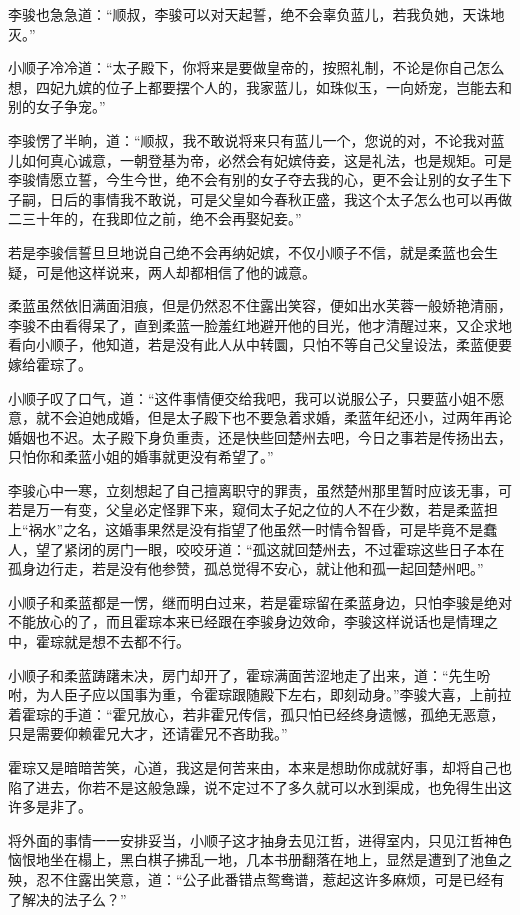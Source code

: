 李骏也急急道：“顺叔，李骏可以对天起誓，绝不会辜负蓝儿，若我负她，天诛地灭。”

小顺子冷冷道：“太子殿下，你将来是要做皇帝的，按照礼制，不论是你自己怎么想，四妃九嫔的位子上都要摆个人的，我家蓝儿，如珠似玉，一向娇宠，岂能去和别的女子争宠。”

李骏愣了半晌，道：“顺叔，我不敢说将来只有蓝儿一个，您说的对，不论我对蓝儿如何真心诚意，一朝登基为帝，必然会有妃嫔侍妾，这是礼法，也是规矩。可是李骏情愿立誓，今生今世，绝不会有别的女子夺去我的心，更不会让别的女子生下子嗣，日后的事情我不敢说，可是父皇如今春秋正盛，我这个太子怎么也可以再做二三十年的，在我即位之前，绝不会再娶妃妾。”

若是李骏信誓旦旦地说自己绝不会再纳妃嫔，不仅小顺子不信，就是柔蓝也会生疑，可是他这样说来，两人却都相信了他的诚意。

柔蓝虽然依旧满面泪痕，但是仍然忍不住露出笑容，便如出水芙蓉一般娇艳清丽，李骏不由看得呆了，直到柔蓝一脸羞红地避开他的目光，他才清醒过来，又企求地看向小顺子，他知道，若是没有此人从中转圜，只怕不等自己父皇设法，柔蓝便要嫁给霍琮了。

小顺子叹了口气，道：“这件事情便交给我吧，我可以说服公子，只要蓝小姐不愿意，就不会迫她成婚，但是太子殿下也不要急着求婚，柔蓝年纪还小，过两年再论婚姻也不迟。太子殿下身负重责，还是快些回楚州去吧，今日之事若是传扬出去，只怕你和柔蓝小姐的婚事就更没有希望了。”

李骏心中一寒，立刻想起了自己擅离职守的罪责，虽然楚州那里暂时应该无事，可若是万一有变，父皇必定怪罪下来，窥伺太子妃之位的人不在少数，若是柔蓝担上“祸水”之名，这婚事果然是没有指望了他虽然一时情令智昏，可是毕竟不是蠢人，望了紧闭的房门一眼，咬咬牙道：“孤这就回楚州去，不过霍琮这些日子本在孤身边行走，若是没有他参赞，孤总觉得不安心，就让他和孤一起回楚州吧。”

小顺子和柔蓝都是一愣，继而明白过来，若是霍琮留在柔蓝身边，只怕李骏是绝对不能放心的了，而且霍琮本来已经跟在李骏身边效命，李骏这样说话也是情理之中，霍琮就是想不去都不行。

小顺子和柔蓝踌躇未决，房门却开了，霍琮满面苦涩地走了出来，道：“先生吩咐，为人臣子应以国事为重，令霍琮跟随殿下左右，即刻动身。”李骏大喜，上前拉着霍琮的手道：“霍兄放心，若非霍兄传信，孤只怕已经终身遗憾，孤绝无恶意，只是需要仰赖霍兄大才，还请霍兄不吝助我。”

霍琮又是暗暗苦笑，心道，我这是何苦来由，本来是想助你成就好事，却将自己也陷了进去，你若不是这般急躁，说不定过不了多久就可以水到渠成，也免得生出这许多是非了。

将外面的事情一一安排妥当，小顺子这才抽身去见江哲，进得室内，只见江哲神色恼恨地坐在榻上，黑白棋子拂乱一地，几本书册翻落在地上，显然是遭到了池鱼之殃，忍不住露出笑意，道：“公子此番错点鸳鸯谱，惹起这许多麻烦，可是已经有了解决的法子么？”

